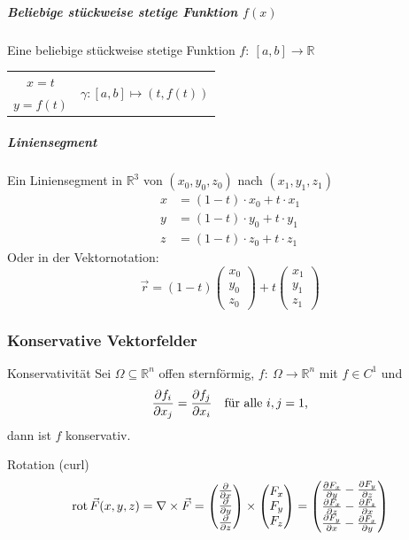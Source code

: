 \documentclass[a4paper,10pt]{article}
\def\R{\mathbb{R}}
\DeclareMathOperator{\rot}{rot}
\begin{document}
\subparagraph{Beliebige stückweise stetige Funktion \texorpdfstring{\( f(x) \)}{f(x)}}
Eine beliebige stückweise stetige Funktion \( f: \: [a, b] \to \R \)
\begin{table}[H]
    \centering
    \footnotesize
    \begin{tabular}{|c|c|}
        \hline
        $x = t$ & \multirow{2}{*}{\centering$\gamma : [a, b] \mapsto (t, f(t))$} \\
        $y = f(t)$ & \\
        \hline
    \end{tabular}
\end{table}

\subparagraph{Liniensegment}
Ein Liniensegment in \( \R^3 \) von \( (x_0, y_0, z_0) \) nach \( (x_1, y_1, z_1) \)
\begin{align*}
    x &= (1 - t) \cdot x_0 + t \cdot x_1 \\
    y &= (1 - t) \cdot y_0 + t \cdot y_1 \\
    z &= (1 - t) \cdot z_0 + t \cdot z_1
\end{align*}
Oder in der Vektornotation:
\[
    \vec{r} = (1 - t) \begin{pmatrix} x_0 \\ y_0 \\ z_0 \end{pmatrix} + t \begin{pmatrix} x_1 \\ y_1 \\ z_1 \end{pmatrix}
\]


\subsubsection{Konservative Vektorfelder}

\begin{mainbox}{Konservativität}
    Sei \( \Omega \subseteq \R^n \) offen sternförmig, \( f: \: \Omega \to \R^n \) mit \( f \in C^1 \) und \[
        \frac{\partial f_i}{\partial x_j} = \frac{\partial f_j}{\partial x_i} \quad \text{für alle \( i, j = 1 \),}
    \] dann ist \( f \) konservativ.
\end{mainbox}

\begin{subbox}{Rotation (curl)}
    \[
        \rot \vec{F}(x, y, z) = \nabla \times \vec{F} = \begin{pmatrix}
            \pdv{}{x} \\ \pdv{}{y} \\ \pdv{}{z}
        \end{pmatrix} \times \begin{pmatrix}
            F_x \\ F_y \\ F_z
        \end{pmatrix} = \begin{pmatrix}
            \pdv{F_x}{y} - \pdv{F_y}{z} \\
            \pdv{F_x}{z} - \pdv{F_z}{x} \\
            \pdv{F_y}{x} - \pdv{F_x}{y}
        \end{pmatrix}
    \]
\end{subbox}
\end{document}
